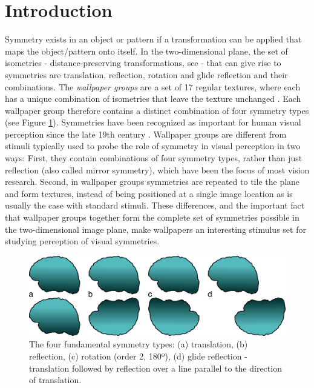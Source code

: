 \documentclass[11pt, twoside]{article}
\begin{document}
\section*{Introduction}
Symmetry exists in an object or pattern if a transformation can be applied that maps the object/pattern onto itself. In the two-dimensional plane, the set of isometries - distance-preserving transformations, see \citep{RN1425} - that can give rise to symmetries are translation, reflection, rotation and glide reflection and their combinations. The \textit{wallpaper groups} are a set of 17 regular textures, where each has a unique combination of isometries that leave the texture unchanged \citep{RN1562,RN1563,RN1425}. Each wallpaper group therefore contains a distinct combination of four symmetry types (see Figure \ref{fig:symmetry_types}). Symmetries have been recognized as important for human visual perception since the late 19th century \citep{mach_1959}.  Wallpaper groups are different from stimuli typically used to probe the role of symmetry in visual perception in two ways: First, they contain combinations of four symmetry types, rather than just reflection (also called mirror symmetry), which have been the focus of most vision research. Second, in wallpaper groups symmetries are repeated to tile the plane and form textures, instead of being positioned at a single image location as is usually the case with standard stimuli. These differences, and the important fact that wallpaper groups together form the complete set of symmetries possible in the two-dimensional image plane, make wallpapers an interesting stimulus set for studying perception of visual symmetries.

\begin{figure}[H]
	\centering
	\includegraphics[width=\linewidth]{./figures/symmetry_types.png}
	\caption{The four fundamental symmetry types: (a) translation, (b) reflection, (c) rotation (order 2, 180º), (d) glide reflection - translation followed by reflection over a line parallel to the direction of translation. }
	\label{fig:symmetry_types}
\end{figure}
\end{document}
